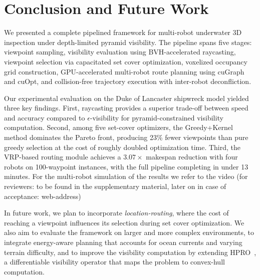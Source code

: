 \documentclass[letterpaper, 10 pt, conference]{ieeeconf}  %
\begin{document}
\section{Conclusion and Future Work}

We presented a complete pipelined framework for multi-robot underwater 3D inspection under depth-limited pyramid visibility. The pipeline spans five stages: viewpoint sampling, visibility evaluation using BVH-accelerated raycasting, viewpoint selection via capacitated set cover optimization, voxelized occupancy grid construction, GPU-accelerated multi-robot route planning using cuGraph and cuOpt, and collision-free trajectory execution with inter-robot deconfliction.

Our experimental evaluation on the Duke of Lancaster shipwreck model yielded three key findings. First, raycasting provides a superior trade-off between speed and accuracy compared to $\epsilon$-visibility for pyramid-constrained visibility computation. Second, among five set-cover optimizers, the Greedy+Kernel method dominates the Pareto front, producing 23\% fewer viewpoints than pure greedy selection at the cost of roughly doubled optimization time. Third, the VRP-based routing module achieves a $3.07\times$ makespan reduction with four robots on 100-waypoint instances, with the full pipeline completing in under 13 minutes. For the multi-robot simulation of the results we refer to the video (for reviewers: to be found in the supplementary material, later on in case of acceptance: web-address)

In future work, we plan to incorporate \emph{location-routing}, where the cost of reaching a viewpoint influences its selection during set cover optimization. We also aim to evaluate the framework on larger and more complex environments, to integrate energy-aware planning that accounts for ocean currents and varying terrain difficulty, and to improve the visibility computation by extending HPRO~\cite{HRPO}, a differentiable visibility operator that maps the problem to convex-hull computation.




\end{document}
